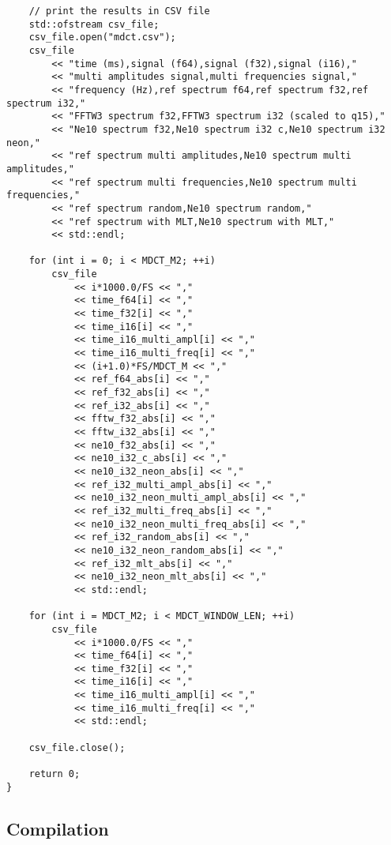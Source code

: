 \documentclass{article}
\begin{document}
\begin{lstlisting}
    // print the results in CSV file
    std::ofstream csv_file;
    csv_file.open("mdct.csv");
    csv_file
        << "time (ms),signal (f64),signal (f32),signal (i16),"
        << "multi amplitudes signal,multi frequencies signal,"
        << "frequency (Hz),ref spectrum f64,ref spectrum f32,ref spectrum i32,"
        << "FFTW3 spectrum f32,FFTW3 spectrum i32 (scaled to q15),"
        << "Ne10 spectrum f32,Ne10 spectrum i32 c,Ne10 spectrum i32 neon,"
        << "ref spectrum multi amplitudes,Ne10 spectrum multi amplitudes,"
        << "ref spectrum multi frequencies,Ne10 spectrum multi frequencies,"
        << "ref spectrum random,Ne10 spectrum random,"
        << "ref spectrum with MLT,Ne10 spectrum with MLT,"
        << std::endl;

    for (int i = 0; i < MDCT_M2; ++i)
        csv_file 
            << i*1000.0/FS << ","
            << time_f64[i] << ","
            << time_f32[i] << ","
            << time_i16[i] << ","
            << time_i16_multi_ampl[i] << ","
            << time_i16_multi_freq[i] << ","
            << (i+1.0)*FS/MDCT_M << ","
            << ref_f64_abs[i] << ","
            << ref_f32_abs[i] << ","
            << ref_i32_abs[i] << ","
            << fftw_f32_abs[i] << ","
            << fftw_i32_abs[i] << ","
            << ne10_f32_abs[i] << ","
            << ne10_i32_c_abs[i] << ","
            << ne10_i32_neon_abs[i] << ","
            << ref_i32_multi_ampl_abs[i] << ","
            << ne10_i32_neon_multi_ampl_abs[i] << ","
            << ref_i32_multi_freq_abs[i] << ","
            << ne10_i32_neon_multi_freq_abs[i] << ","
            << ref_i32_random_abs[i] << ","
            << ne10_i32_neon_random_abs[i] << ","
            << ref_i32_mlt_abs[i] << ","
            << ne10_i32_neon_mlt_abs[i] << ","
            << std::endl;

    for (int i = MDCT_M2; i < MDCT_WINDOW_LEN; ++i)
        csv_file 
            << i*1000.0/FS << ","
            << time_f64[i] << ","
            << time_f32[i] << ","
            << time_i16[i] << ","
            << time_i16_multi_ampl[i] << ","
            << time_i16_multi_freq[i] << ","
            << std::endl;

    csv_file.close();

    return 0;
}
\end{lstlisting}

\subsection{Compilation}\label{app:spectrum_comparison_cmake}
\end{document}

